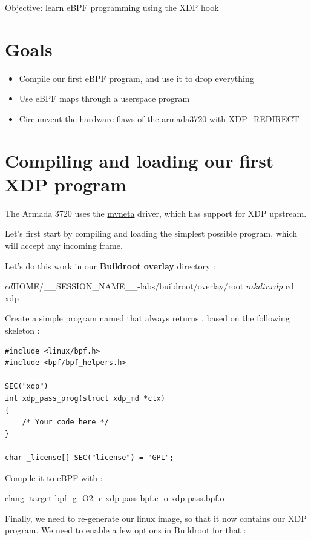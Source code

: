 {Objective: learn eBPF programming using the XDP hook}

\section{Goals}

 \begin{itemize}
 \item Compile our first eBPF program, and use it to drop everything
 \item Use eBPF maps through a userspace program
 \item Circumvent the hardware flaws of the armada3720 with XDP\_REDIRECT
 \end{itemize}

\section{Compiling and loading our first XDP program}

The Armada 3720 uses the \href{tod}{mvneta} driver, which has support for XDP upstream.

Let's first start by compiling and loading the simplest possible program, which
will accept any incoming frame.

Let's do this work in our \textbf{Buildroot overlay} directory :

\begin{hostbashinput}
$ cd $HOME/__SESSION_NAME__-labs/buildroot/overlay/root
$ mkdir xdp
$ cd xdp
\end{hostbashinput}

Create a simple program named  that always returns , based on the following
skeleton :

\begin{verbatim}
#include <linux/bpf.h>
#include <bpf/bpf_helpers.h>

SEC("xdp")
int xdp_pass_prog(struct xdp_md *ctx)
{
	/* Your code here */
}

char _license[] SEC("license") = "GPL";
\end{verbatim}

Compile it to eBPF with  :

\begin{hostbashinput}
clang -target bpf -g -O2 -c xdp-pass.bpf.c -o xdp-pass.bpf.o
\end{hostbashinput}

Finally, we need to re-generate our linux image, so that it now contains our XDP
program. We need to enable a few options in Buildroot for that :


